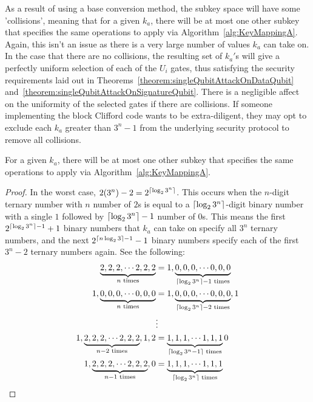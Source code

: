 As a result of using a base conversion method, the subkey space will have some 'collisions', meaning that for a given $k_a$, there will be at most one other subkey that specifies the same operations to apply via Algorithm~\ref{alg:KeyMappingA}. Again, this isn't an issue as there is a very large number of values $k_a$ can take on. In the case that there are no collisions, the resulting set of $k_a'$s will give a perfectly uniform selection of each of the $U_i$ gates, thus satisfying the security requirements laid out in Theorems~\ref{theorem:singleQubitAttackOnDataQubit} and~\ref{theorem:singleQubitAttackOnSignatureQubit}. There is a negligible affect on the uniformity of the selected gates if there are collisions. If someone implementing the block Clifford code wants to be extra-diligent, they may opt to exclude each $k_a$ greater than $3^n - 1$ from the underlying security protocol to remove all collisions.

\begin{theorem}
\label{theorem:collisionForMappingA}
For a given $k_a$, there will be at most one other subkey that specifies the same operations to apply via Algorithm~\ref{alg:KeyMappingA}.
\end{theorem}
\begin{proof}
In the worst case, $2(3^n) - 2 = 2^{\lceil\log_2 3^n\rceil}$. This occurs when the $n$-digit ternary number with $n$ number of $2$s is equal to a $\lceil\log_2 3^n\rceil$-digit binary number with a single $1$ followed by $\lceil\log_2 3^n\rceil - 1$ number of $0$s. This means the first $2^{\lceil\log_2 3^n\rceil - 1} + 1$ binary numbers that $k_a$ can take on specify all $3^n$ ternary numbers, and the next $2^{\lceil n \log_2 3\rceil - 1} - 1$ binary numbers specify each of the first $3^n - 2$ ternary numbers again. See the following:
\begin{align}
\underbrace{2, 2, 2, \cdots 2,2,2}_{n \text{ times}} &= 1, \underbrace{0, 0, 0, \cdots 0,0,0}_{\lceil\log_2 3^n\rceil - 1 \text{ times}}\\
1,\underbrace{0, 0, 0, \cdots 0,0,0}_{n \text{ times}} &= 1, \underbrace{0, 0, 0, \cdots 0,0,0}_{\lceil\log_2 3^n\rceil - 2 \text{ times}}, 1\\
& \vdots \nonumber \\
1, \underbrace{2, 2, 2, \cdots 2,2,2}_{n-2 \text{ times}}, 1,2 &= \underbrace{1, 1, 1, \cdots 1,1,1}_{\lceil\log_2 3^n - 1\rceil\text{ times}} 0\\
1, \underbrace{2, 2, 2, \cdots 2,2,2}_{n-1 \text{ times}}, 0 &= \underbrace{1, 1, 1, \cdots 1,1,1}_{\lceil\log_2 3^n\rceil\text{ times}}
\end{align}
\end{proof}

